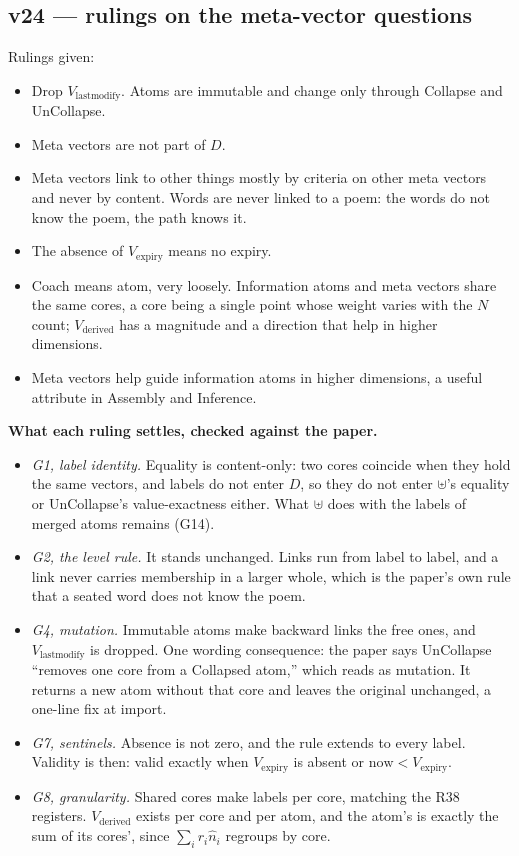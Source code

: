 \documentclass[11pt]{article}
\begin{document}
\subsection*{v24 --- rulings on the meta-vector questions}
Rulings given:
\begin{itemize}
\item Drop $V_{\text{lastmodify}}$. Atoms are immutable and change only
through Collapse and UnCollapse.
\item Meta vectors are not part of $D$.
\item Meta vectors link to other things mostly by criteria on other meta
vectors and never by content. Words are never linked to a poem: the words
do not know the poem, the path knows it.
\item The absence of $V_{\text{expiry}}$ means no expiry.
\item Coach means atom, very loosely. Information atoms and meta vectors
share the same cores, a core being a single point whose weight varies with
the $N$ count; $V_{\text{derived}}$ has a magnitude and a direction that
help in higher dimensions.
\item Meta vectors help guide information atoms in higher dimensions, a
useful attribute in Assembly and Inference.
\end{itemize}

\textbf{What each ruling settles, checked against the paper.}
\begin{itemize}
\item \emph{G1, label identity.} Equality is content-only: two cores
coincide when they hold the same vectors, and labels do not enter $D$, so
they do not enter $\uplus$'s equality or UnCollapse's value-exactness
either. What $\uplus$ does with the labels of merged atoms remains (G14).
\item \emph{G2, the level rule.} It stands unchanged. Links run from label
to label, and a link never carries membership in a larger whole, which is
the paper's own rule that a seated word does not know the poem.
\item \emph{G4, mutation.} Immutable atoms make backward links the free
ones, and $V_{\text{lastmodify}}$ is dropped. One wording consequence: the
paper says UnCollapse ``removes one core from a Collapsed atom,'' which
reads as mutation. It returns a new atom without that core and leaves the
original unchanged, a one-line fix at import.
\item \emph{G7, sentinels.} Absence is not zero, and the rule extends to
every label. Validity is then: valid exactly when $V_{\text{expiry}}$ is
absent or $\text{now}<V_{\text{expiry}}$.
\item \emph{G8, granularity.} Shared cores make labels per core, matching
the R38 registers. $V_{\text{derived}}$ exists per core and per atom, and
the atom's is exactly the sum of its cores', since
$\sum_i r_i\hat n_i$ regroups by core.
\end{itemize}
\end{document}
